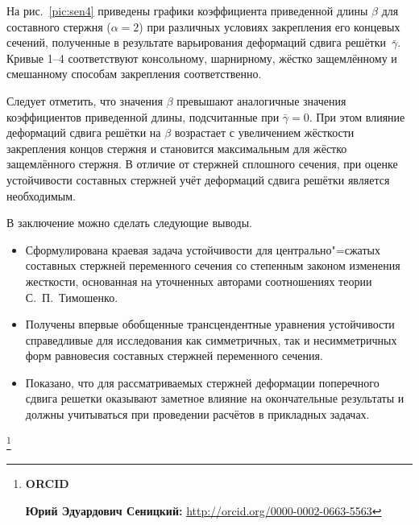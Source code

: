 На рис.~\ref{pic:sen4} приведены графики коэффициента приведенной длины $\beta $ для
составного стержня ($\alpha=2$) при различных условиях закрепления его концевых сечений, полученные в
результате варьирования деформаций сдвига решётки~$\bar {\gamma }$. Кривые 1--4 соответствуют консольному, шарнирному, жёстко защемлённому и
смешанному способам закрепления соответственно.






Следует отметить, что значения
$\beta$ превышают аналогичные значения коэффициентов приведенной длины, подсчитанные
при $\bar {\gamma }=0$. При этом влияние деформаций сдвига решётки на
$\beta$
возрастает с увеличением жёсткости закрепления концов стержня и становится
максимальным для жёстко защемлённого стержня. В отличие от стержней
сплошного сечения, при оценке устойчивости составных стержней учёт деформаций
сдвига решётки является необходимым.

В заключение можно сделать следующие выводы.

\begin{itemize}

\item[1.] Сформулирована краевая задача устойчивости для центрально"=сжатых составных
стержней переменного сечения со степенным законом изменения жесткости,
основанная на уточненных авторами соотношениях теории С.~П.~Тимошенко.

\item[2.] Получены впервые обобщенные трансцендентные уравнения устойчивости
справедливые для исследования как симметричных, так и несимметричных форм
равновесия составных стержней переменного сечения.

\item[3.] Показано, что для рассматриваемых стержней деформации поперечного сдвига
решетки оказывают заметное влияние на окончательные результаты и должны
учитываться при проведении расчётов в прикладных задачах.


\end{itemize}


\thanks{{\bf ORCID}

{\bf Юрий Эдуардович Сеницкий:} \url{http://orcid.org/0000-0002-0663-5563}


}

